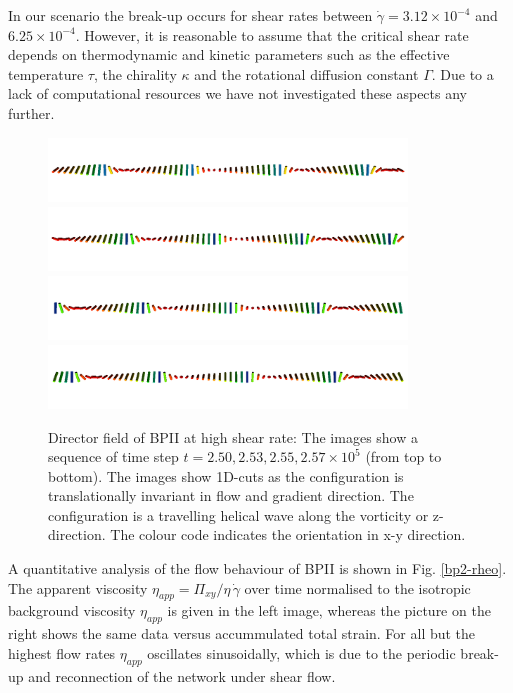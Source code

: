 \documentclass[aps,pre,reprint,superscriptaddress]{revtex4}
\newcommand{\e}[1]{\times10^{#1}}
\newcommand{\gd}{\dot{\gamma}}
\begin{document}
In our scenario the break-up occurs for shear rates between $\gd=3.12\e{-4}$ and $6.25\e{-4}$.
However, it is reasonable to assume that the critical shear rate depends on thermodynamic and kinetic parameters
such as the effective temperature $\tau$, the chirality $\kappa$ and the rotational diffusion constant $\Gamma$.
Due to a lack of computational resources we have not investigated these aspects any further.

\begin{figure}[h]
\includegraphics[width=0.85\textwidth]{dir+y-250k_run949.png}
\includegraphics[width=0.85\textwidth]{dir+y-253k_run949.png}
\includegraphics[width=0.85\textwidth]{dir+y-255k_run949.png}
\includegraphics[width=0.85\textwidth]{dir+y-257k_run949.png}
\caption{Director field of BPII at high shear rate: The images show a sequence of time step $t=2.50, 2.53,2.55, 2.57\e{5}$ (from top to bottom). The images show 1D-cuts as the configuration is translationally invariant in flow and gradient direction. The configuration is a travelling helical wave along the vorticity or z-direction. The colour code indicates the orientation in x-y direction.}
\label{bp2-high}
\end{figure}

A quantitative analysis of the flow behaviour of BPII is shown in Fig. \ref{bp2-rheo}.
The apparent viscosity $\eta_{app}=\Pi_{xy}/\eta\,\gd$ over time normalised to
the isotropic background viscosity $\eta_{app}$ is given in the left image, whereas
the picture on the right shows the same data versus accummulated total strain.
For all but the highest flow rates $\eta_{app}$ oscillates sinusoidally, which
is due to the periodic break-up and reconnection of the network under shear flow.
\end{document}
